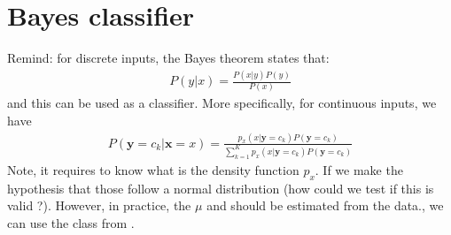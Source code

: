 \documentclass[letterpaper,10pt,english]{jupyterBook}
\begin{document}
\section{Bayes classifier}
\label{\detokenize{06:bayes-classifier}}
\sphinxAtStartPar
Remind: for discrete inputs, the Bayes theorem states that:
\begin{equation*}
\begin{split}P(y|x) = \frac{P(x|y)P(y)}{P(x)}\end{split}
\end{equation*}
\sphinxAtStartPar
and this can be used as a classifier. More specifically, for continuous inputs, we have
\begin{equation*}
\begin{split}P(\mathbf{y}=c_k|\mathbf{x}=x) = \frac{p_x(x|\mathbf{y}=c_k)P(\mathbf{y}=c_k)}{\sum_{k=1}^K p_x(x|\mathbf{y}=c_k)P(\mathbf{y}=c_k)}\end{split}
\end{equation*}
\sphinxAtStartPar
Note, it requires to know what is the density function \(p_x\). If we make the hypothesis that those follow a normal distribution (how could we test if this is valid ?). However, in practice, the \(\mu\) and  should be estimated from the data., we can use the  class from .
\end{document}
